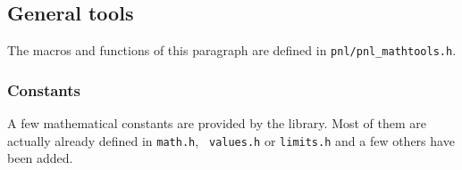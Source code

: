 
\subsection{General tools}

The macros and functions of this paragraph are defined in \verb!pnl/pnl_mathtools.h!.

\subsubsection{Constants} A few mathematical constants are provided by the
library. Most of them are actually already defined in {\tt math.h}, {\tt
  values.h} or {\tt limits.h} and a few others have been added.
\begin{describeconst}
\end{describeconst}

